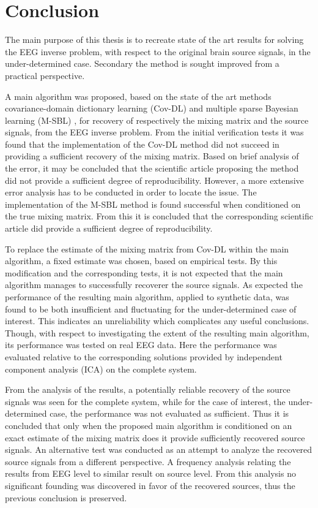 \chapter{Conclusion}
The main purpose of this thesis is to recreate state of the art results for solving the EEG inverse problem, with respect to the original brain source signals, in the under-determined case.
Secondary the method is sought improved from a practical perspective.

A main algorithm was proposed, based on the state of the art methods covariance-domain dictionary learning (Cov-DL) \cite{Balkan2015} and multiple sparse Bayesian learning (M-SBL) \cite{Balkan2014}, for recovery of respectively the mixing matrix and the source signals, from the EEG inverse problem. 
From the initial verification tests it was found that the implementation of the Cov-DL method did not succeed in providing a sufficient recovery of the mixing matrix. Based on brief analysis of the error, it may be concluded that the scientific article proposing the method did not provide a sufficient degree of reproducibility. However, a more extensive error analysis has to be conducted in order to locate the issue.  
The implementation of the M-SBL method is found successful when conditioned on the true mixing matrix. From this it is concluded that the corresponding scientific article did provide a sufficient degree of reproducibility. 

To replace the estimate of the mixing matrix from Cov-DL within the main algorithm, a fixed estimate was chosen, based on empirical tests.
By this modification and the corresponding tests, it is not expected that the main algorithm manages to successfully recoverer the source signals. As expected the performance of the resulting main algorithm, applied to synthetic data, was found to be both insufficient and fluctuating for the under-determined case of interest. This indicates an unreliability which complicates any useful conclusions. 
Though, with respect to investigating the extent of the resulting main algorithm, its performance was tested on real EEG data. Here the performance was evaluated relative to the corresponding solutions provided by independent component analysis (ICA) on the complete system. 

From the analysis of the results, a potentially reliable recovery of the source signals was seen for the complete system, while for the case of interest, the under-determined case, the performance was not evaluated as sufficient. Thus it is concluded that only when the proposed main algorithm is conditioned on an exact estimate of the mixing matrix does it provide sufficiently recovered source signals.  
An alternative test was conducted as an attempt to analyze the recovered source signals from a different perspective. A frequency analysis relating the results from EEG level to similar result on source level.
From this analysis no significant founding was discovered in favor of the recovered sources, thus the previous conclusion is preserved. 

